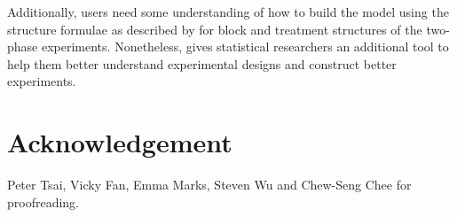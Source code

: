 \documentclass[article]{jss}
\begin{document}
Additionally, users need some understanding of how to build the model using the structure formulae as described by \cite{Wilkinson1973} for block and treatment structures of the two-phase experiments. Nonetheless,  gives statistical researchers an additional tool to help them better understand experimental designs and construct better experiments.

\section*{Acknowledgement}
Peter Tsai, Vicky Fan, Emma Marks, Steven Wu and Chew-Seng Chee for proofreading.


\end{document}
